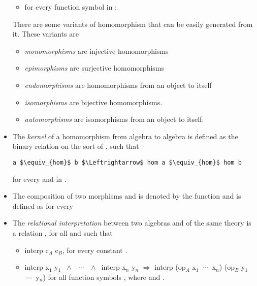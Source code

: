 \begin{itemize}
\begin{itemize}
        \item for every function symbol in : 
    \end{itemize}
    There are some variants of homomorphism that can be easily generated from it. These variants are  
    \begin{itemize}
    	\item \emph{monomorphisms} are injective homomorphisms 
  	  	\item \emph{epimorphisms} are surjective homomorphisms 
    	\item \emph{endomorphisms} are homomorphisms from an object to itself 
    	\item \emph{isomorphisms} are bijective homomorphisms. 
    	\item \emph{automorphisms} are isomorphisms from an object to itself. 
    \end{itemize}
    \item The \emph{kernel} of a homomorphism from algebra  to algebra  is defined as the binary relation  on the sort of , such that 
    \begin{lstlisting}[mathescape] 
    a $\equiv_{hom}$ b $\Leftrightarrow$ hom a $\equiv_{hom}$ hom b
    \end{lstlisting}
    for every  and  in . 
    \item The composition of two morphisms  and  is denoted by the function  and is defined as 
     for every    
    \item The \emph{relational interpretation} between two algebras  and  of the same theory is a relation , for all  and  such that 
    \begin{itemize}
    \item interp c$_A$ c$_B$, for every constant .  
    \item interp x$_1$ y$_1$ $\ \wedge\ $ $\ \cdots\ $ $\ \wedge\ $ interp x$_n$ y$_n$ $\Rightarrow$ interp (op$_A$ x$_1$ $\ \cdots\ $ x$_n$) (op$_B$ y$_1$ $\ \cdots\ $ y$_n$) for all function symbols , where  and . 
    \end{itemize}
    

\end{itemize}
